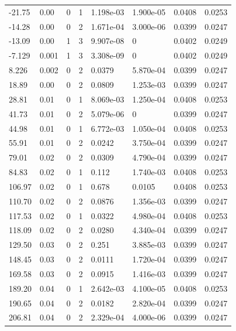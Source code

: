 \documentclass[preview]{standalone}
\begin{document}
{{\begin{tabular}{L{1.2cm}C{1.2cm} C{0.3cm}C{0.5cm} C{1.4cm}C{1.4cm} C{1.4cm}C{1.4cm}}
  -21.75  &  0.00  & 0     &  1 &  1.198e-03  & 1.900e-05  & 0.0408 &  0.0253   \\ 
  -14.28  &  0.00  & 0     &  2 &  1.671e-04  & 3.000e-06  & 0.0399 &  0.0247   \\ 
  -13.09  &  0.00  & 1     &  3 &  9.907e-08  & 0  & 0.0402 &  0.0249   \\ 
  -7.129  &  0.001  & 1     &  3 &  3.308e-09  & 0  & 0.0402 &  0.0249   \\ 
  8.226  &  0.002  & 0     &  2 &  0.0379  & 5.870e-04  & 0.0399 &  0.0247   \\ 
  18.89  &  0.00  & 0     &  2 &  0.0809  & 1.253e-03  & 0.0399 &  0.0247   \\ 
  28.81  &  0.01  & 0     &  1 &  8.069e-03  & 1.250e-04  & 0.0408 &  0.0253   \\ 
  41.73  &  0.01  & 0     &  2 &  5.079e-06  & 0  & 0.0399 &  0.0247   \\ 
  44.98  &  0.01  & 0     &  1 &  6.772e-03  & 1.050e-04  & 0.0408 &  0.0253   \\ 
  55.91  &  0.01  & 0     &  2 &  0.0242  & 3.750e-04  & 0.0399 &  0.0247   \\ 
  79.01  &  0.02  & 0     &  2 &  0.0309  & 4.790e-04  & 0.0399 &  0.0247   \\ 
  84.83  &  0.02  & 0     &  1 &  0.112  & 1.740e-03  & 0.0408 &  0.0253   \\ 
  106.97  &  0.02  & 0     &  1 &  0.678  & 0.0105  & 0.0408 &  0.0253   \\ 
  110.70  &  0.02  & 0     &  2 &  0.0876  & 1.356e-03  & 0.0399 &  0.0247   \\ 
  117.53  &  0.02  & 0     &  1 &  0.0322  & 4.980e-04  & 0.0408 &  0.0253   \\ 
  118.09  &  0.02  & 0     &  2 &  0.0280  & 4.340e-04  & 0.0399 &  0.0247   \\ 
  129.50  &  0.03  & 0     &  2 &  0.251  & 3.885e-03  & 0.0399 &  0.0247   \\ 
  148.45  &  0.03  & 0     &  2 &  0.0111  & 1.720e-04  & 0.0399 &  0.0247   \\ 
  169.58  &  0.03  & 0     &  2 &  0.0915  & 1.416e-03  & 0.0399 &  0.0247   \\ 
  189.20  &  0.04  & 0     &  1 &  2.642e-03  & 4.100e-05  & 0.0408 &  0.0253   \\ 
  190.65  &  0.04  & 0     &  2 &  0.0182  & 2.820e-04  & 0.0399 &  0.0247   \\ 
  206.81  &  0.04  & 0     &  2 &  2.329e-04  & 4.000e-06  & 0.0399 &  0.0247   \\ 

\end{tabular}}}
\end{document}
